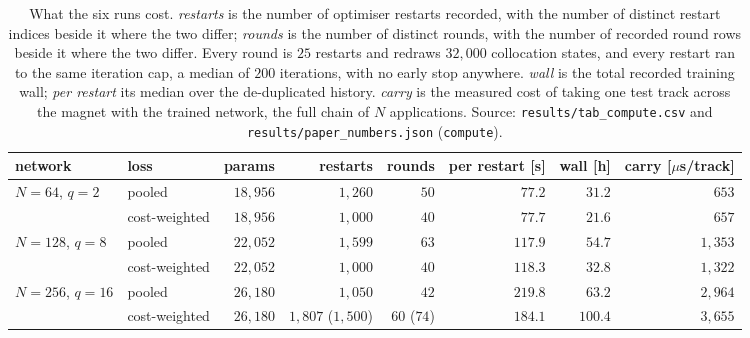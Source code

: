 \documentclass[11pt,a4paper]{article}
\begin{document}
\begin{table}[tbp]
  \centering
  \caption{What the six runs cost. \emph{restarts} is the number of optimiser
  restarts recorded, with the number of distinct restart indices beside it where
  the two differ; \emph{rounds} is the number of distinct rounds, with the
  number of recorded round rows beside it where the two differ. Every round is $25$ restarts and
  redraws $32{,}000$ collocation states, and every restart ran to the same
  iteration cap, a median of $200$ iterations, with no early stop anywhere.
  \emph{wall} is the total recorded training wall; \emph{per restart} its
  median over the de-duplicated history. \emph{carry} is the measured cost of
  taking one test track across the magnet with the trained network, the full
  chain of $N$ applications. Source: \texttt{results/tab\_compute.csv} and
  \texttt{results/paper\_numbers.json} (\texttt{compute}).}
  \label{tab:cost}
  \footnotesize
  \setlength{\tabcolsep}{4pt}
  \begin{tabular}{llrrrrrr}
    \toprule
    network & loss & params & restarts & rounds & per restart [s] &
    wall [h] & carry [\!$\mu$s/track] \\
    \midrule
    $N = 64$, $q = 2$   & pooled        & $18{,}956$ & $1{,}260$ & $50$ & $77.2$  & $31.2$  & $653$ \\
                        & cost-weighted & $18{,}956$ & $1{,}000$ & $40$ & $77.7$  & $21.6$  & $657$ \\
    \addlinespace
    $N = 128$, $q = 8$  & pooled        & $22{,}052$ & $1{,}599$ & $63$ & $117.9$ & $54.7$  & $1{,}353$ \\
                        & cost-weighted & $22{,}052$ & $1{,}000$ & $40$ & $118.3$ & $32.8$  & $1{,}322$ \\
    \addlinespace
    $N = 256$, $q = 16$ & pooled        & $26{,}180$ & $1{,}050$ & $42$ & $219.8$ & $63.2$  & $2{,}964$ \\
                        & cost-weighted & $26{,}180$ & $1{,}807$ ($1{,}500$) & $60$ ($74$) & $184.1$ & $100.4$ & $3{,}655$ \\
    \bottomrule
  \end{tabular}
\end{table}
\end{document}
